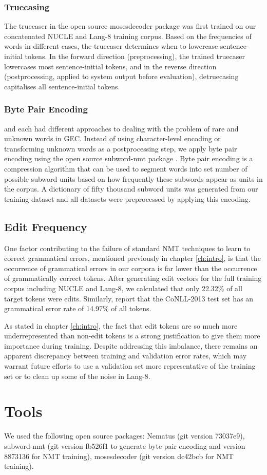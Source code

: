 \subsubsection{Truecasing}
The truecaser in the open source mosesdecoder package was first trained on our concatenated NUCLE and Lang-8 training corpus. Based on the frequencies of words in different cases, the truecaser determines when to lowercase sentence-initial tokens. In the forward direction (preprocessing), the trained truecaser lowercases most sentence-initial tokens, and in the reverse direction (postprocessing, applied to system output before evaluation), detruecasing capitalises all sentence-initial tokens.

\subsubsection{Byte Pair Encoding}
\citet{Xie2016NeuralAttention} and \citet{Yuan2016GrammaticalTranslation} each had different approaches to dealing with the problem of rare and unknown words in GEC. Instead of using character-level encoding or transforming unknown words as a postprocessing step, we apply byte pair encoding using the open source subword-nmt package \citep{Sennrich2015NeuralUnits}. Byte pair encoding is a compression algorithm that can be used to segment words into set number of possible subword units based on how frequently these subwords appear as units in the corpus. A dictionary of fifty thousand subword units was generated from our training dataset and all datasets were preprocessed by applying this encoding.

\subsection{Edit Frequency} \label{subsec:error-rates}
One factor contributing to the failure of standard NMT techniques to learn to correct grammatical errors, mentioned previously in chapter \ref{ch:intro}, is that the occurrence of grammatical errors in our corpora is far lower than the occurrence of grammatically correct tokens. After generating edit vectors for the full training corpus including NUCLE and Lang-8, we calculated that only 22.32\% of all target tokens were edits. Similarly, \citet{Junczys-Dowmunt2016Phrase-basedCorrection} report that the CoNLL-2013 test set has an grammatical error rate of 14.97\% of all tokens.

As stated in chapter \ref{ch:intro}, the fact that edit tokens are so much more underrepresented than non-edit tokens is a strong justification to give them more importance during training. Despite addressing this imbalance, there remains an apparent discrepancy between training and validation error rates, which may warrant future efforts to use a validation set more representative of the training set or to clean up some of the noise in Lang-8.

\section{Tools}
We used the following open source packages: Nematus (git version 73037e9), subword-nmt (git version fb526f1 to generate byte pair encoding and version 8873136 for NMT training), mosesdecoder (git version dc42bcb for NMT training).